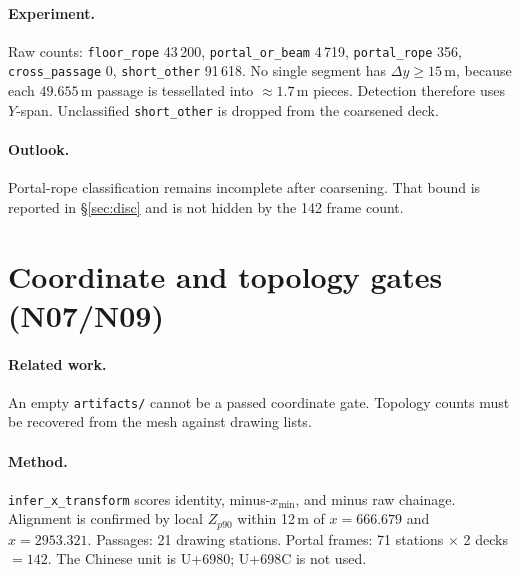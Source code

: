\documentclass[11pt,a4paper]{article}
\begin{document}
\paragraph{Experiment.}
Raw counts: \texttt{floor\_rope} 43\,200, \texttt{portal\_or\_beam} 4\,719,
\texttt{portal\_rope} 356, \texttt{cross\_passage} 0, \texttt{short\_other}
91\,618. No single segment has \(\Delta y\ge 15\)\,m, because each
\(49.655\)\,m passage is tessellated into \(\approx 1.7\)\,m pieces.
Detection therefore uses \(Y\)-span. Unclassified \texttt{short\_other} is
dropped from the coarsened deck.

\paragraph{Outlook.}
Portal-rope classification remains incomplete after coarsening. That bound
is reported in \S\ref{sec:disc} and is not hidden by the 142 frame count.

\section{Coordinate and topology gates (N07/N09)}
\label{sec:gates}

\paragraph{Related work.}
An empty \texttt{artifacts/} cannot be a passed coordinate gate. Topology
counts must be recovered from the mesh against drawing lists.

\paragraph{Method.}
\texttt{infer\_x\_transform} scores identity, minus-\(x_{\min}\), and minus
raw chainage. Alignment is confirmed by local \(Z_{p90}\) within 12\,m of
\(x=666.679\) and \(x=2953.321\). Passages: 21 drawing stations. Portal
frames: 71 stations \(\times\) 2 decks \(=142\). The Chinese unit is U+6980;
U+698C is not used.
\end{document}

